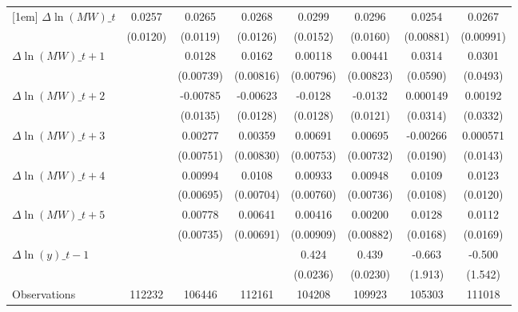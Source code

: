 {\begin{tabular}{l*{7}{c}}
[1em]
$\Delta \ln(MW)\_{t}$&   0.0257\sym{**} &   0.0265\sym{**} &   0.0268\sym{**} &   0.0299\sym{*}  &   0.0296\sym{*}  &   0.0254\sym{***}&   0.0267\sym{**} \\
          & (0.0120)         & (0.0119)         & (0.0126)         & (0.0152)         & (0.0160)         &(0.00881)         &(0.00991)         \\
[1em]
$\Delta \ln(MW)\_{t+1}$&                  &   0.0128\sym{*}  &   0.0162\sym{*}  &  0.00118         &  0.00441         &   0.0314         &   0.0301         \\
          &                  &(0.00739)         &(0.00816)         &(0.00796)         &(0.00823)         & (0.0590)         & (0.0493)         \\
[1em]
$\Delta \ln(MW)\_{t+2}$&                  & -0.00785         & -0.00623         &  -0.0128         &  -0.0132         & 0.000149         &  0.00192         \\
          &                  & (0.0135)         & (0.0128)         & (0.0128)         & (0.0121)         & (0.0314)         & (0.0332)         \\
[1em]
$\Delta \ln(MW)\_{t+3}$&                  &  0.00277         &  0.00359         &  0.00691         &  0.00695         & -0.00266         & 0.000571         \\
          &                  &(0.00751)         &(0.00830)         &(0.00753)         &(0.00732)         & (0.0190)         & (0.0143)         \\
[1em]
$\Delta \ln(MW)\_{t+4}$&                  &  0.00994         &   0.0108         &  0.00933         &  0.00948         &   0.0109         &   0.0123         \\
          &                  &(0.00695)         &(0.00704)         &(0.00760)         &(0.00736)         & (0.0108)         & (0.0120)         \\
[1em]
$\Delta \ln(MW)\_{t+5}$&                  &  0.00778         &  0.00641         &  0.00416         &  0.00200         &   0.0128         &   0.0112         \\
          &                  &(0.00735)         &(0.00691)         &(0.00909)         &(0.00882)         & (0.0168)         & (0.0169)         \\
[1em]
$\Delta \ln(y)\_{t-1}$&                  &                  &                  &    0.424\sym{***}&    0.439\sym{***}&   -0.663         &   -0.500         \\
          &                  &                  &                  & (0.0236)         & (0.0230)         &  (1.913)         &  (1.542)         \\
\hline
Observations&   112232         &   106446         &   112161         &   104208         &   109923         &   105303         &   111018         \\
\hline\hline
\end{tabular}
}
